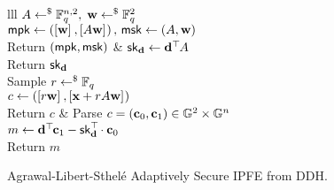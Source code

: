 \begin{figure}[htb]
\centering
\begin{pcarray}{lll}
		{
			$A \gets^{\$} \mathbb{F}_q^{n, 2}, \; \mathbf{w} \gets^{\$} \mathbb{F}_q^2$
				\\
			$\mathsf{mpk} \gets \left( \left[{\mathbf{w}}\right]_{}, \left[{A\mathbf{w}}\right]_{} \right), \, \mathsf{msk} \gets \left(A, \mathbf{w}\right)$
				\\
			Return $(\mathsf{mpk}, \mathsf{msk})$
		}
	&
		{
			$\mathsf{sk}_{\mathbf{d}} \gets \mathbf{d}^\top\hspace{-.1em} A$
				\\
			Return $\mathsf{sk}_{\mathbf{d}}$
		}
	\\
		{
			Sample $r \gets^{\$} \mathbb{F}_q$
				\\
			$c \gets \left(\left[{r \mathbf{w}}\right]_{}, \left[{\mathbf{x} + r A \mathbf{w}}\right]_{} \right)$
				\\
			Return $c$
		}
	&
		{
			Parse $c = (\mathbf{c}_0, \mathbf{c}_1) \in \mathbb{G}^2 \times \mathbb{G}^n$
				\\
			$m \gets \mathbf{d}^\top\hspace{-.1em} \mathbf{c}_1 - \mathsf{sk}_{\mathbf{d}}^\top\hspace{-.1em} \cdot \mathbf{c}_0$
				\\
			Return $m$
		}
\end{pcarray}
\caption{Agrawal-Libert-Sthel\'{e} Adaptively Secure IPFE from DDH.}
\label{prot:AgrLibSth16:IPFE}
\end{figure}

